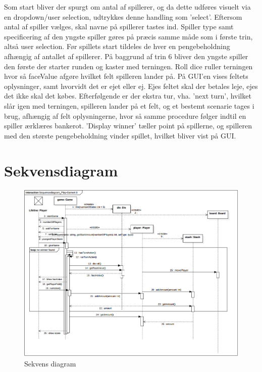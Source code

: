 \noindent Som start bliver der spurgt om antal af spillerer, og da dette udføres visuelt via en dropdown/user selection, udtrykkes denne handling som 'select'.
Eftersom antal af spiller vælges, skal navne på spillerer tastes ind.
Spiller type samt specificering af den yngste spiller gøres på præcis samme måde som i første trin, altså user selection.
Før spillets start tildeles de hver en pengebeholdning afhængig af antallet af spillerer.
På baggrund af trin 6 bliver den yngste spiller den første der starter runden og kaster med terningen.
Roll dice ruller terningen hvor så faceValue afgøre hvilket felt spilleren lander på.
På GUI'en vises feltets oplysninger, samt hvorvidt det er ejet eller ej. Ejes feltet skal der betales leje, ejes det ikke skal det købes.
Efterfølgende er der ekstra tur, vha. 'next turn', hvilket slår igen med terningen, spilleren lander på et felt, og et bestemt scenarie tages i brug, afhængig af felt oplysningerne, hvor så samme procedure følger indtil en spiller ærklæres bankerot.
'Display winner' tæller point på spillerne, og spilleren med den største pengebeholdning vinder spillet, hvilket bliver vist på GUI.\\

\section{Sekvensdiagram}
\begin{figure}[H]
    \begin{center}
        \includegraphics[width=\columnwidth]{graphics/domain/SQdiagram.png}
        \caption{Sekvens diagram}
        \label{fig:sekvens_diagram}
    \end{center}
\end{figure}
